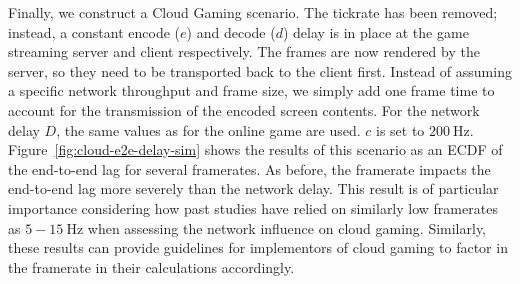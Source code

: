 Finally, we construct a Cloud Gaming scenario. The tickrate has been removed;  instead, a constant encode ($e$) and decode ($d$) delay is in place at the game streaming server and client respectively. The frames are now rendered by the server, so they need to be transported back to the client first. Instead of assuming a specific network throughput and frame size, we simply add one frame time to account for the transmission of the encoded screen contents. For the network delay $D$, the same values as for the online game are used. $c$ is set to $\SI{200}{\hertz}$. Figure~\ref{fig:cloud-e2e-delay-sim} shows the results of this scenario as an \gls{ECDF} of the end-to-end lag for several framerates. As before, the framerate impacts the end-to-end lag more severely than the network delay. This result is of particular importance considering how past studies have relied on similarly low framerates as $5-\SI{15}{\hertz}$ when assessing the network influence on cloud gaming. Similarly, these results can provide guidelines for implementors of cloud gaming to factor in the framerate in their calculations accordingly.

